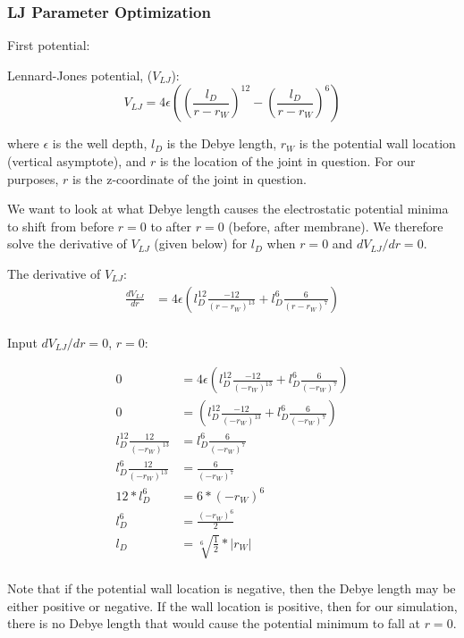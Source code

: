 \documentclass[../AdvancementSummary.tex]{subfiles}
\begin{document}
\subsubsection{LJ Parameter Optimization}

First potential:

Lennard-Jones potential, ($V_{LJ}$):
\begin{equation*}
V_{LJ} = 4\epsilon\left(\left(\frac{l_{D}}{r-r_W}\right)^{12} - \left(\frac{l_{D}}{r-r_W}\right)^6\right)
\end{equation*}

where $\epsilon$ is the well depth, $l_D$ is the Debye length, $r_W$ is the potential wall location (vertical asymptote), and $r$ is the location of the joint in question.  For our purposes, $r$ is the z-coordinate of the joint in question.

We want to look at what Debye length causes the electrostatic potential minima to shift from before $r=0$ to after $r=0$ (before, after membrane).  We therefore solve the derivative of $V_{LJ}$ (given below) for $l_D$ when $r=0$ and $dV_{LJ}/dr = 0$.

The derivative of $V_{LJ}$:
\begin{align*}
\frac{dV_{LJ}}{dr} &= 4\epsilon\left( l_D^{12}\frac{-12}{(r-r_W)^{13}}+l_D^6\frac{6}{(r-r_W)^7}\right) \\
\end{align*}

Input $dV_{LJ}/dr = 0$, $r=0$:

\begin{align*}
0 &= 4\epsilon\left( l_D^{12}\frac{-12}{(-r_W)^{13}}+l_D^6\frac{6}{(-r_W)^7}\right) \\
0 &=\left( l_D^{12}\frac{-12}{(-r_W)^{13}}+l_D^6\frac{6}{(-r_W)^7}\right) \\
 l_D^{12}\frac{12}{(-r_W)^{13}} &= l_D^6\frac{6}{(-r_W)^7}  \\
l_D^{6}\frac{12}{(-r_W)^{13}} &= \frac{6}{(-r_W)^7}   \\
12*l_D^6 &= 6 * (-r_W)^6  \\
l_D^6 &= \frac{(-r_W)^6}{2} \\
l_D &= \sqrt[6]{\frac{1}{2}}*|r_W| \\
\end{align*}

Note that if the potential wall location is negative, then the Debye length may be either positive or negative. If the wall location is positive, then for our simulation, there is no Debye length that would cause the potential minimum to fall at $r=0$.  
\end{document}
